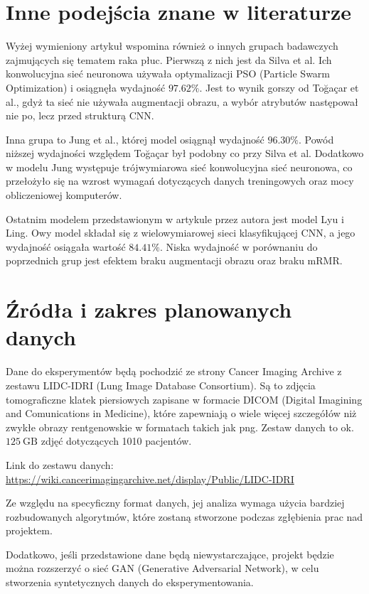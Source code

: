 \documentclass[10pt]{article}
\begin{document}
\section{Inne podejścia znane w literaturze}
Wyżej wymieniony artykuł wspomina również o innych grupach badawczych zajmujących się tematem raka płuc. Pierwszą z nich jest da Silva et al. Ich konwolucyjna sieć neuronowa używała optymalizacji PSO (Particle Swarm Optimization) i osiągnęła wydajność $97.62 \%$. Jest to wynik gorszy od Toğaçar et al., gdyż ta sieć nie używała augmentacji obrazu, a wybór atrybutów następował nie po, lecz przed strukturą $\mathrm{CNN}$.

Inna grupa to Jung et al., której model osiągnął wydajność $96.30 \%$. Powód niższej wydajności względem Toğaçar był podobny co przy Silva et al. Dodatkowo w modelu Jung występuje trójwymiarowa sieć konwolucyjna sieć neuronowa, co przełożyło się na wzrost wymagań dotyczących danych treningowych oraz mocy obliczeniowej komputerów.

Ostatnim modelem przedstawionym w artykule przez autora jest model Lyu i Ling. Owy model składał się z wielowymiarowej sieci klasyfikującej CNN, a jego wydajność osiągała wartość $84.41 \%$. Niska wydajność w porównaniu do poprzednich grup jest efektem braku augmentacji obrazu oraz braku mRMR.

\section{Źródła i zakres planowanych danych}
Dane do eksperymentów będą pochodzić ze strony Cancer Imaging Archive z zestawu LIDC-IDRI (Lung Image Database Consortium). Są to zdjęcia tomograficzne klatek piersiowych zapisane w formacie DICOM (Digital Imagining and Comunications in Medicine), które zapewniają o wiele więcej szczegółów niż zwykłe obrazy rentgenowskie w formatach takich jak png. Zestaw danych to ok. $125 \mathrm{~GB}$ zdjęć dotyczących 1010 pacjentów.

Link do zestawu danych: \href{https://wiki.cancerimagingarchive.net/display/Public/LIDC-IDRI}{https://wiki.cancerimagingarchive.net/display/Public/LIDC-IDRI}

Ze względu na specyficzny format danych, jej analiza wymaga użycia bardziej rozbudowanych algorytmów, które zostaną stworzone podczas zgłębienia prac nad projektem.

Dodatkowo, jeśli przedstawione dane będą niewystarczające, projekt będzie można rozszerzyć o sieć GAN (Generative Adversarial Network), w celu stworzenia syntetycznych danych do eksperymentowania.
\end{document}
